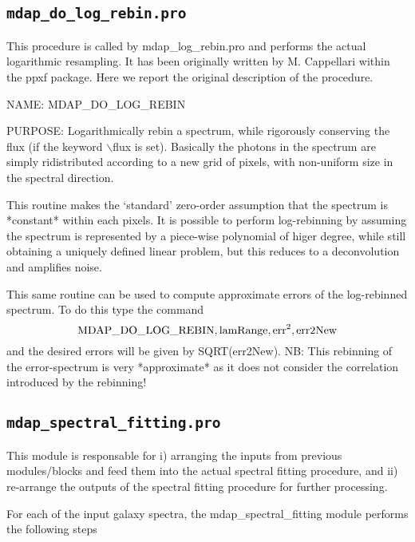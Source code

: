 \documentclass[11pt]{book}
\begin{document}
\subsection{{\tt mdap\_do\_log\_rebin.pro}}
\label{dap_sec:mdap_do_log_rebin}

This procedure is called by mdap\_log\_rebin.pro and performs the
actual logarithmic resampling. It has been originally written by
M. Cappellari within the ppxf package. Here we report the original
description of the procedure.

\medskip

 NAME: MDAP\_DO\_LOG\_REBIN

\medskip

 PURPOSE: Logarithmically rebin a spectrum, while rigorously
 conserving the flux (if the keyword $\backslash$flux is set).
 Basically the photons in the spectrum are simply ridistributed
 according to a new grid of pixels, with non-uniform size in the
 spectral direction.

 This routine makes the `standard' zero-order assumption that the
 spectrum is *constant* within each pixels. It is possible to perform
 log-rebinning by assuming the spectrum is represented by a piece-wise
 polynomial of higer degree, while still obtaining a uniquely defined
 linear problem, but this reduces to a deconvolution and amplifies
 noise.

 This same routine can be used to compute approximate errors of the
 log-rebinned spectrum. To do this type the command
    \[
        {\rm MDAP\_DO\_LOG\_REBIN, lamRange, err}^2{\rm , err2New}
    \]
 and the desired errors will be given by SQRT(err2New).  NB: This
 rebinning of the error-spectrum is very *approximate* as it does not
 consider the correlation introduced by the rebinning!


\subsection{{\tt mdap\_spectral\_fitting.pro}}
\label{dap_sec:mdap_spectral_fitting}

This module is responsable for i) arranging the inputs from previous
modules/blocks and feed them into the actual spectral fitting
procedure, and ii) re-arrange the outputs of the spectral fitting
procedure for further processing.

For each of the input galaxy spectra, the mdap\_spectral\_fitting
module performs the following steps
\end{document}
